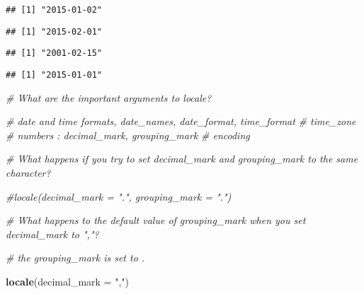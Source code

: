 \documentclass[]{article}
\newenvironment{Shaded}{\begin{snugshade}}{\end{snugshade}}
\newcommand{\KeywordTok}[1]{\textcolor[rgb]{0.13,0.29,0.53}{\textbf{#1}}}
\newcommand{\DataTypeTok}[1]{\textcolor[rgb]{0.13,0.29,0.53}{#1}}
\newcommand{\StringTok}[1]{\textcolor[rgb]{0.31,0.60,0.02}{#1}}
\newcommand{\CommentTok}[1]{\textcolor[rgb]{0.56,0.35,0.01}{\textit{#1}}}
\newcommand{\NormalTok}[1]{#1}
\begin{document}
\begin{verbatim}
## [1] "2015-01-02"
\end{verbatim}

\begin{Shaded}
\end{Shaded}

\begin{verbatim}
## [1] "2015-02-01"
\end{verbatim}

\begin{Shaded}
\end{Shaded}

\begin{verbatim}
## [1] "2001-02-15"
\end{verbatim}

\begin{Shaded}
\end{Shaded}

\begin{verbatim}
## [1] "2015-01-01"
\end{verbatim}

\begin{Shaded}
\begin{Highlighting}[]
\CommentTok{# What are the important arguments to locale? }

\CommentTok{# date and time formats, date_names, date_format, time_format}
\CommentTok{# time_zone}
\CommentTok{# numbers : decimal_mark, grouping_mark}
\CommentTok{# encoding }

\CommentTok{# What happens if you try to set decimal_mark and grouping_mark to the same character?}

\CommentTok{#locale(decimal_mark = ".", grouping_mark = ".")}

\CommentTok{# What happens to the default value of grouping_mark when you set decimal_mark to ","? }

\CommentTok{# the grouping_mark is set to . }

\KeywordTok{locale}\NormalTok{(}\DataTypeTok{decimal_mark =} \StringTok{","}\NormalTok{)}
\end{Highlighting}
\end{Shaded}
\end{document}
